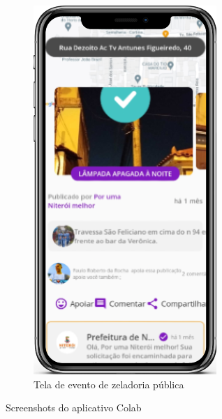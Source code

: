 \begin{figure}[ht]
\begin{subfigure}{0.33\textwidth}
	\end{subfigure}%
	\begin{subfigure}{0.33\textwidth}
		\centering
		\includegraphics[width=\textwidth]{images/colab_app_evento.png}
		\caption{Tela de evento de zeladoria pública}
	\end{subfigure}
	\caption{Screenshots do aplicativo Colab}
\end{figure}

